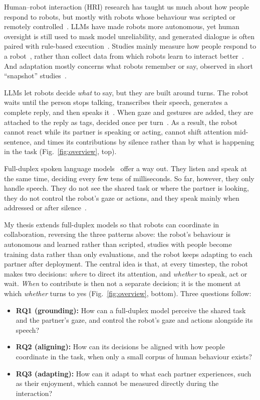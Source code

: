 \documentclass[sigconf,review,anonymous,nonacm]{acmart}
\begin{document}
Human--robot interaction (HRI) research has taught us much about how people respond to robots, but mostly with robots whose behaviour was scripted or remotely controlled~\cite{riek2012wizard,baxter2016characterising,clabaugh2019escaping}. LLMs have made robots more autonomous, yet human oversight is still used to mask model unreliability, and generated dialogue is often paired with rule-based execution~\cite{wang2026research}. Studies mainly measure how people respond to a robot~\cite{wang2026research}, rather than collect data from which robots learn to interact better~\cite{lemaignan2018pinsoro,senft2019teaching}. And adaptation mostly concerns what robots remember or say, observed in short ``snapshot'' studies~\cite{wang2026research,churamani2020continual,irfan2021lifelong}.

LLMs let robots decide \emph{what} to say, but they are built around turns. The robot waits until the person stops talking, transcribes their speech, generates a complete reply, and then speaks it~\cite{wang2026research}. When gaze and gestures are added, they are attached to the reply as tags, decided once per turn~\cite{lee2026recipe}. As a result, the robot cannot react while its partner is speaking or acting, cannot shift attention mid-sentence, and times its contributions by silence rather than by what is happening in the task (Fig.~\ref{fig:overview}, top).

Full-duplex spoken language models~\cite{defossez2024moshi,roy2026personaplex} offer a way out. They listen and speak at the same time, deciding every few tens of milliseconds. So far, however, they only handle speech. They do not see the shared task or where the partner is looking, they do not control the robot's gaze or actions, and they speak mainly when addressed or after silence~\cite{peng2026full}.

My thesis extends full-duplex models so that robots can coordinate in collaboration, reversing the three patterns above: the robot's behaviour is autonomous and learned rather than scripted, studies with people become training data rather than only evaluations, and the robot keeps adapting to each partner after deployment. The central idea is that, at every timestep, the robot makes two decisions: \emph{where} to direct its attention, and \emph{whether} to speak, act or wait. \emph{When} to contribute is then not a separate decision; it is the moment at which \emph{whether} turns to yes (Fig.~\ref{fig:overview}, bottom). Three questions follow:
\begin{itemize}
 \item \textbf{RQ1 (grounding):} How can a full-duplex model perceive the shared task and the partner's gaze, and control the robot's gaze and actions alongside its speech?
 \item \textbf{RQ2 (aligning):} How can its decisions be aligned with how people coordinate in the task, when only a small corpus of human behaviour exists?
 \item \textbf{RQ3 (adapting):} How can it adapt to what each partner experiences, such as their enjoyment, which cannot be measured directly during the interaction?
\end{itemize}
\end{document}
